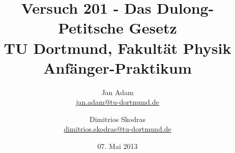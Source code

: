 



\title{Versuch 201 - Das Dulong-Petitsche Gesetz\\				%
\large TU Dortmund, Fakultät Physik\\ 
\normalsize Anfänger-Praktikum}

\author{Jan Adam\\			%
{\small \href{jan.adam@tu-dortmund.de}{jan.adam@tu-dortmund.de}}	%
\and						%
Dimitrios Skodras\\					%
{\small \href{dimitrios.skodras@tu-dortmund.de}{dimitrios.skodras@tu-dortmund.de}}		%
}
\date{07. Mai 2013}				%





\maketitle					%
\thispagestyle{empty} 				%



\tableofcontents


\newpage					%



